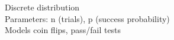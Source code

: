 \documentclass[preview]{standalone}
\begin{document}
Discrete distribution\\Parameters: n (trials), p (success probability)\\Models coin flips, pass/fail tests\\
\end{document}
